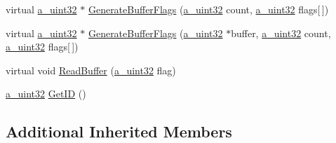 \begin{DoxyCompactItemize}
\item 
virtual \hyperlink{_common_defines_8h_a964296f9770051b9e4807b1f180dd416}{a\+\_\+uint32} $\ast$ \hyperlink{class_agmd_1_1_g_l_frame_buffer_a93a42ffd26eedfd083c40937715bc80e}{Generate\+Buffer\+Flags} (\hyperlink{_common_defines_8h_a964296f9770051b9e4807b1f180dd416}{a\+\_\+uint32} count, \hyperlink{_common_defines_8h_a964296f9770051b9e4807b1f180dd416}{a\+\_\+uint32} flags\mbox{[}$\,$\mbox{]})
\item 
virtual \hyperlink{_common_defines_8h_a964296f9770051b9e4807b1f180dd416}{a\+\_\+uint32} $\ast$ \hyperlink{class_agmd_1_1_g_l_frame_buffer_ab95941126c68ed5bc31f40b9456b29f3}{Generate\+Buffer\+Flags} (\hyperlink{_common_defines_8h_a964296f9770051b9e4807b1f180dd416}{a\+\_\+uint32} $\ast$buffer, \hyperlink{_common_defines_8h_a964296f9770051b9e4807b1f180dd416}{a\+\_\+uint32} count, \hyperlink{_common_defines_8h_a964296f9770051b9e4807b1f180dd416}{a\+\_\+uint32} flags\mbox{[}$\,$\mbox{]})
\item 
virtual void \hyperlink{class_agmd_1_1_g_l_frame_buffer_a8d628d1036d539015d3a0d044d8fb35f}{Read\+Buffer} (\hyperlink{_common_defines_8h_a964296f9770051b9e4807b1f180dd416}{a\+\_\+uint32} flag)
\item 
\hyperlink{_common_defines_8h_a964296f9770051b9e4807b1f180dd416}{a\+\_\+uint32} \hyperlink{class_agmd_1_1_g_l_frame_buffer_ac34ada2b175fbfc06b1f62561f5c0bf1}{Get\+I\+D} ()
\end{DoxyCompactItemize}
\subsection*{Additional Inherited Members}



